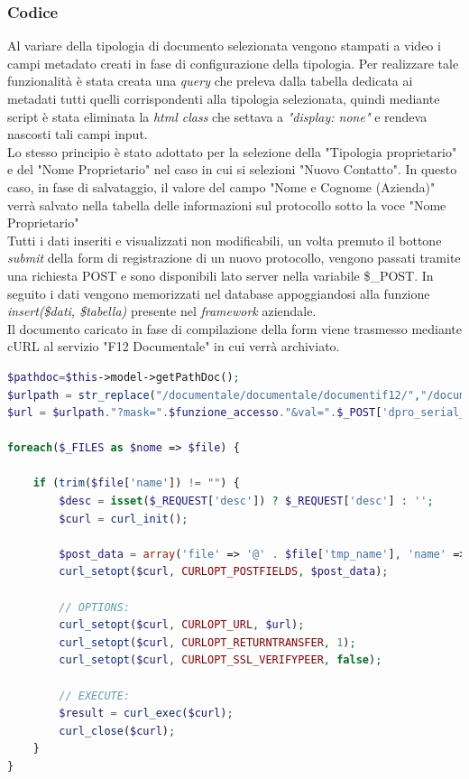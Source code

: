     \subsubsection{Codice}
        Al variare della tipologia di documento selezionata vengono stampati a video i campi metadato creati in fase di configurazione della tipologia. Per realizzare tale funzionalità è stata creata una \textit{query} che preleva dalla tabella dedicata ai metadati tutti quelli corrispondenti alla tipologia selezionata, quindi mediante script è stata eliminata la \textit{html class} che settava a \textit{"display: none"} e rendeva nascosti tali campi input.
        \\
        Lo stesso principio è stato adottato per la selezione della "Tipologia proprietario" e del "Nome Proprietario" nel caso in cui si selezioni "Nuovo Contatto".
        In questo caso, in fase di salvataggio, il valore del campo "Nome e Cognome (Azienda)" verrà salvato nella tabella delle informazioni sul protocollo sotto la voce "Nome Proprietario"
        \\
        Tutti i dati inseriti e visualizzati non modificabili, un volta premuto il bottone \textit{submit} della form di registrazione di un nuovo protocollo, vengono passati tramite una richiesta POST e sono disponibili lato server nella variabile \$\_POST. In seguito i dati vengono memorizzati nel database appoggiandosi alla funzione \textit{insert(\$dati, \$tabella)} presente nel \textit{framework} aziendale.
        \\
        Il documento caricato in fase di compilazione della form viene trasmesso mediante cURL al servizio "F12 Documentale" in cui verrà archiviato. 
       \newpage \begin{lstlisting}[language=PHP, caption=Upload su Documentale]
$pathdoc=$this->model->getPathDoc();
$urlpath = str_replace("/documentale/documentale/documentif12/","/documentale_coop/documentale/uploadfile", $pathdoc);
$url = $urlpath."?mask=".$funzione_accesso."&val=".$_POST['dpro_serial_doc']."&ope=".$_SESSION[NOME_SESSIONE]['user']['sigla']."&rowval=&db=dbf12&tipologia=".$_POST['dpro_tipo']."&external=1";

foreach($_FILES as $nome => $file) {

    if (trim($file['name']) != "") {
        $desc = isset($_REQUEST['desc']) ? $_REQUEST['desc'] : '';
        $curl = curl_init();

        $post_data = array('file' => '@' . $file['tmp_name'], 'name' => $file['name'], 'type' =$file['type'], 'dsc' => $desc);
        curl_setopt($curl, CURLOPT_POSTFIELDS, $post_data);

        // OPTIONS:
        curl_setopt($curl, CURLOPT_URL, $url);
        curl_setopt($curl, CURLOPT_RETURNTRANSFER, 1);
        curl_setopt($curl, CURLOPT_SSL_VERIFYPEER, false);

        // EXECUTE:
        $result = curl_exec($curl);
        curl_close($curl);
    }
}
        \end{lstlisting}
